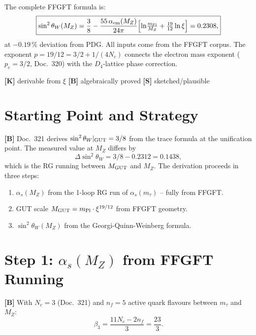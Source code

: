 The complete FFGFT formula is:
\begin{equation}
  \boxed{\sin^2\theta_W(M_Z)
  = \frac{3}{8}
  - \frac{55\,\alpha_{\rm em}(M_Z)}{24\pi}
    \Bigl[\ln\!\tfrac{m_{\rm Pl}}{M_Z}
         + \tfrac{19}{12}\ln\xi\Bigr]
  = 0.2308,}
  \label{eq:main}
\end{equation}
at $-0.19\,\%$ deviation from PDG. All inputs come from the FFGFT
corpus. The exponent $p = 19/12 = 3/2 + 1/(4N_c)$ connects the
electron mass exponent ($p_e = 3/2$, Doc.~320) with the
$D_4$-lattice phase correction.

\begin{keyresult}
\textbf{[K]} derivable from $\xi$ \quad
\textbf{[B]} algebraically proved \quad
\textbf{[S]} sketched/plausible
\end{keyresult}

\section{Starting Point and Strategy}

\textbf{[B]} Doc.~321 derives $\sin^2\theta_W|_{\rm GUT} = 3/8$ from
the trace formula at the unification point. The measured value at
$M_Z$ differs by
\begin{equation}
  \Delta\sin^2\theta_W = 3/8 - 0.2312 = 0.1438,
\end{equation}
which is the RG running between $M_{\rm GUT}$ and $M_Z$.
The derivation proceeds in three steps:
\begin{enumerate}
  \item $\alpha_s(M_Z)$ from the 1-loop RG run of $\alpha_s(m_\tau)$
    -- fully from FFGFT.
  \item GUT scale $M_{\rm GUT} = m_{\rm Pl}\cdot\xi^{19/12}$
    from FFGFT geometry.
  \item $\sin^2\theta_W(M_Z)$ from the Georgi-Quinn-Weinberg formula.
\end{enumerate}

\section{Step 1: $\alpha_s(M_Z)$ from FFGFT Running}

\textbf{[B]} With $N_c=3$ (Doc.~321) and $n_f=5$ active quark
flavours between $m_\tau$ and $M_Z$:
\begin{equation}
  \beta_3 = \frac{11N_c - 2n_f}{3} = \frac{23}{3}.
\end{equation}

